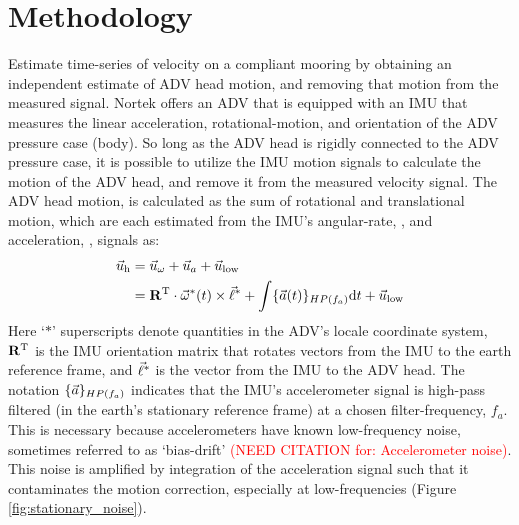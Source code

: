 \documentclass[twocol]{ametsoc}
\newcommand{\citeneeded}[1]{\textcolor{red}{(NEED CITATION for: #1)}}
\begin{document}
\section{Methodology}
\label{sec:methods}


Estimate time-series of velocity on a compliant mooring by obtaining an independent estimate of ADV head motion, and removing that motion from the measured signal. Nortek offers an ADV that is equipped with an IMU that measures the linear acceleration, rotational-motion, and orientation of the ADV pressure case (body). So long as the ADV head is rigidly connected to the ADV pressure case, it is possible to utilize the IMU motion signals to calculate the motion of the ADV head, and remove it from the measured velocity signal.  The ADV head motion, is calculated as the sum of rotational and translational motion, which are each estimated from the IMU's angular-rate, \AngRt, and acceleration, \Accel, signals as:
\begin{align}
  \vec{u}_\mathrm{h} & = \vec{u}_\omega + \vec{u}_a + \vec{u}_\mathrm{low} \\
      & = \mathbf{R}^\mathrm{T} \cdot \vec{\omega}^*(t)\times\vec{\ell}^* + \int \{{\vec{a}}(t)\}_{HP(f_{a})} \mathrm{d}t + \vec{u}_\mathrm{low}
\end{align}
Here `$*$' superscripts denote quantities in the ADV's locale coordinate system, $\mathbf{R}^\mathrm{T}$ is the IMU orientation matrix that rotates vectors from the IMU to the earth reference frame, and $\vec{\ell}^*$ is the vector from the IMU to the ADV head. The notation $\{{\vec{a}}\}_{HP(f_a)}$ indicates that the IMU's accelerometer signal is high-pass filtered (in the earth's stationary reference frame) at a chosen filter-frequency, $f_a$. This is necessary because accelerometers have known low-frequency noise, sometimes referred to as `bias-drift' \citeneeded{Accelerometer noise}. This noise is amplified by integration of the acceleration signal such that it contaminates the motion correction, especially at low-frequencies (Figure \ref{fig:stationary_noise}).
\end{document}
